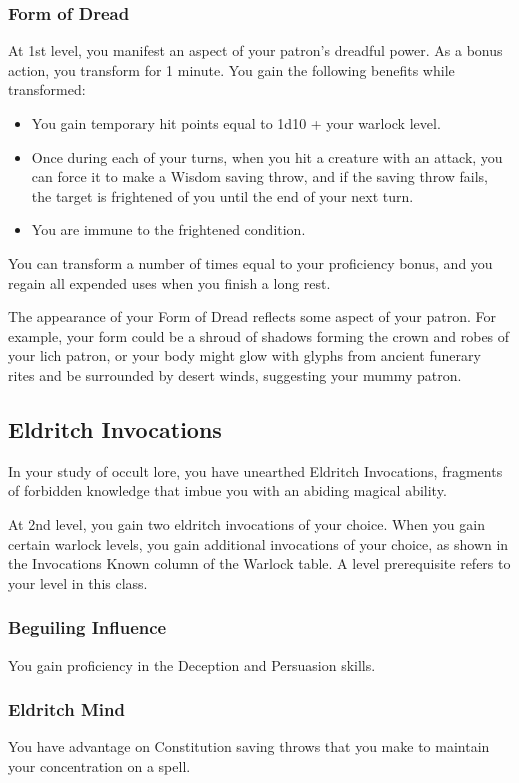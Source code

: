 \documentclass[letterpaper,openany,oneside,twocolumn]{book}
\begin{document}
\subsubsection{Form of Dread}
At 1st level, you manifest an aspect of your patron's dreadful power. As a bonus action, you transform for 1 minute. You gain the following benefits while transformed:
\begin{itemize}
	\item You gain temporary hit points equal to 1d10 + your warlock level.
	\item Once during each of your turns, when you hit a creature with an attack, you can force it to make a Wisdom saving throw, and if the saving throw fails, the target is frightened of you until the end of your next turn.
	\item You are immune to the frightened condition.
\end{itemize}
You can transform a number of times equal to your proficiency bonus, and you regain all expended uses when you finish a long rest.

The appearance of your Form of Dread reflects some aspect of your patron. For example, your form could be a shroud of shadows forming the crown and robes of your lich patron, or your body might glow with glyphs from ancient funerary rites and be surrounded by desert winds, suggesting your mummy patron.
\subsection*{Eldritch Invocations}
In your study of occult lore, you have unearthed Eldritch Invocations, fragments of forbidden knowledge that imbue you with an abiding magical ability.

At 2nd level, you gain two eldritch invocations of your choice. When you gain certain warlock levels, you gain additional invocations of your choice, as shown in the Invocations Known column of the Warlock table. A level prerequisite refers to your level in this class.
\subsubsection*{Beguiling Influence}
You gain proficiency in the Deception and Persuasion skills.
\subsubsection*{Eldritch Mind}
You have advantage on Constitution saving throws that you make to maintain your concentration on a spell.
\end{document}
